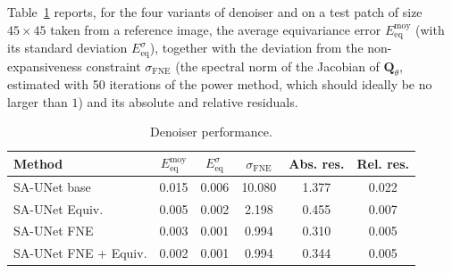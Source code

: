 \documentclass{article}
\begin{document}
Table~\ref{tab:perf_denoiser} reports, for the four variants of denoiser and on a test patch of size
$45\times45$ taken from a reference image, the average equivariance
error $E_{\mathrm{eq}}^{\mathrm{moy}}$ (with its standard deviation
$E_{\mathrm{eq}}^{\sigma}$), together with the deviation from the
non-expansiveness constraint $\sigma_{\mathrm{FNE}}$ (the spectral
norm of the Jacobian of $\mathbf{Q}_\theta$, estimated with 50
iterations of the power method, which should ideally be no larger than $1$) and
its absolute and relative residuals. \vspace{-0.2cm}




\begin{table}[H]
\centering
\scriptsize
\renewcommand{\arraystretch}{0.95}
\begin{tabular}{lccccc}
\toprule
\textbf{Method}
& $E_{\mathrm{eq}}^{\mathrm{moy}}$
& $E_{\mathrm{eq}}^{\sigma}$
& $\sigma_{\mathrm{FNE}}$
& Abs. res.
& Rel. res. \\
\midrule
SA-UNet base
& 0.015 & 0.006 & 10.080 & 1.377 & 0.022 \\
SA-UNet  Equiv.
& 0.005 & 0.002 & 2.198 & 0.455 & 0.007 \\
SA-UNet  FNE
& 0.003 & 0.001 & 0.994 & 0.310 & 0.005 \\
SA-UNet FNE + Equiv.
& 0.002 & 0.001 & 0.994 & 0.344 & 0.005 \\
\bottomrule
\end{tabular}
\caption{Denoiser performance.
}\vspace{-0.4cm}
\label{tab:perf_denoiser}
\end{table}
\end{document}
